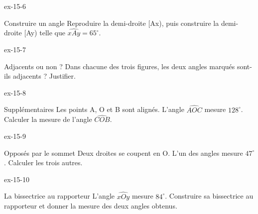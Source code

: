 \begin{blocLivre}{ex-15-6}\begin{exercice}[2]{Construire un angle}
Reproduire la demi-droite [Ax), puis construire la demi-droite [Ay) telle que $\widehat{xAy}=65^\circ$.
\label{fig-ex-15-6}
\end{exercice}\end{blocLivre}
\begin{blocLivre}{ex-15-7}\begin{exercice}[2]{Adjacents ou non ?}
Dans chacune des trois figures, les deux angles marqués sont-ils adjacents ? Justifier.
\label{fig-ex-15-7}
\end{exercice}\end{blocLivre}
\begin{blocLivre}{ex-15-8}\begin{exercice}[2]{Supplémentaires}
Les points A, O et B sont alignés. L’angle $\widehat{AOC}$ mesure $128^\circ$. Calculer la mesure de l’angle $\widehat{COB}$.
\label{fig-ex-15-8}
\end{exercice}\end{blocLivre}
\begin{blocLivre}{ex-15-9}\begin{exercice}[2]{Opposés par le sommet}
Deux droites se coupent en O. L’un des angles mesure $47^\circ$. Calculer les trois autres.
\label{fig-ex-15-9}
\end{exercice}\end{blocLivre}
\begin{blocLivre}{ex-15-10}\begin{exercice}[2]{La bissectrice au rapporteur}
L’angle $\widehat{xOy}$ mesure $84^\circ$. Construire sa bissectrice au rapporteur et donner la mesure des deux angles obtenus.
\label{fig-ex-15-10}
\end{exercice}\end{blocLivre}

